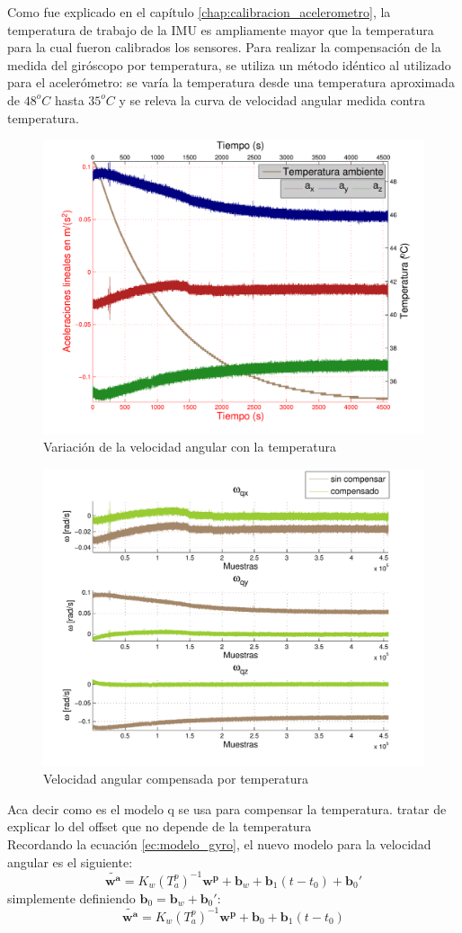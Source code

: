 \documentclass[main]{subfiles}
\begin{document}
Como fue explicado en el capítulo \ref{chap:calibracion_acelerometro}, la temperatura de trabajo de la IMU es ampliamente mayor que la temperatura para la cual fueron calibrados los sensores. Para realizar la compensación de la medida del giróscopo por temperatura, se utiliza un método idéntico al utilizado para el acelerómetro: se varía la temperatura desde una temperatura aproximada de $48^oC$ hasta $35^oC$ y se releva la curva de velocidad angular medida contra temperatura.

\begin{figure}[h!]
	\centering
	\includegraphics[width=.7\textwidth]{./pics_gyro/wtemp.pdf}
	\caption{Variación de la velocidad angular con la temperatura}
	\label{fig:wtemp}
\end{figure}

\begin{figure}[h!]
	\centering
	\includegraphics[width=.9\textwidth]{./pics_gyro/wcompensado.pdf}
	\caption{Velocidad angular compensada por temperatura}
	\label{fig:wcomp}
\end{figure}

Aca decir como es el modelo q se usa para compensar la temperatura. tratar de explicar lo del offset que no depende de la temperatura\\

Recordando la ecuación \ref{ec:modelo_gyro}, el nuevo modelo para la velocidad angular es el siguiente:
$$\tilde{\mathbf{w^a}}=K_w(T_a^p)^{-1}\mathbf{w^p}+\mathbf{b}_w+\mathbf{b}_1(t-t_0)+\mathbf{b}_0'$$
simplemente definiendo $\mathbf{b}_0=\mathbf{b}_w+\mathbf{b}_0'$:
$$\tilde{\mathbf{w^a}}=K_w(T_a^p)^{-1}\mathbf{w^p}+\mathbf{b}_0+\mathbf{b}_1(t-t_0)$$
\end{document}
